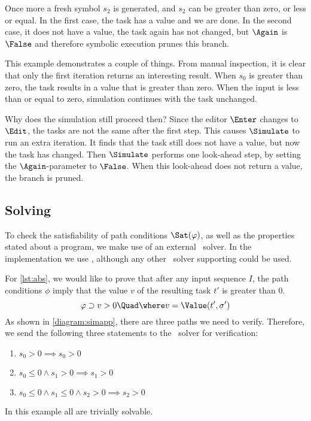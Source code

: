 Once more a fresh symbol $s_2$ is generated, and $s_2$ can be greater than zero, or less or equal.
In the first case, the task has a value and we are done.
In the second case, it does not have a value, the task again has not changed, but $\Again$ is $\False$ and therefore symbolic execution prunes this branch.

This example demonstrates a couple of things.
From manual inspection, it is clear that only the first iteration returns an interesting result.
When $s_0$ is greater than zero, the task results in a value that is greater than zero.
When the input is less than or equal to zero, simulation continues with the task unchanged.

Why does the simulation still proceed then?
Since the editor $\Enter$ changes to $\Edit$, the tasks are not the same after the first step.
This causes $\Simulate$ to run an extra iteration.
It finds that the task still does not have a value, but now the task has changed.
Then $\Simulate$ performs one look-ahead step, by setting the $\Again$-parameter to $\False$.
When this look-ahead does not return a value, the branch is pruned.



\subsection{Solving}

To check the satisfiability of path conditions $\Sat(\phi)$, as well as the properties stated about a program,
we make use of an external \SMT~solver.
In the implementation we use \ZTHREE, although any other \SMT~solver supporting \SMTLIB could be used.

For \cref{lst:abs}, we would like to prove that after any input sequence $I$,
the path conditions $\phi$ imply that the value $v$ of the resulting task $t'$ is greater than $0$.
\begin{equation*}
  \phi \implies v  > 0 \Quad \where v = \Value(t',\sigma')
\end{equation*}
As shown in \cref{diagram:simapp}, there are three paths we need to verify.
Therefore, we send the following three statements to the \SMT~solver for verification:
\begin{enumerate}
  \item $s_0 > 0                                   \implies s_0 > 0  $
  \item $s_0 \leq 0 \land s_1 > 0                  \implies s_1 > 0  $
  \item $s_0 \leq 0 \land s_1 \leq 0 \land s_2 > 0 \implies s_2 > 0  $
\end{enumerate}
In this example all are trivially solvable.



